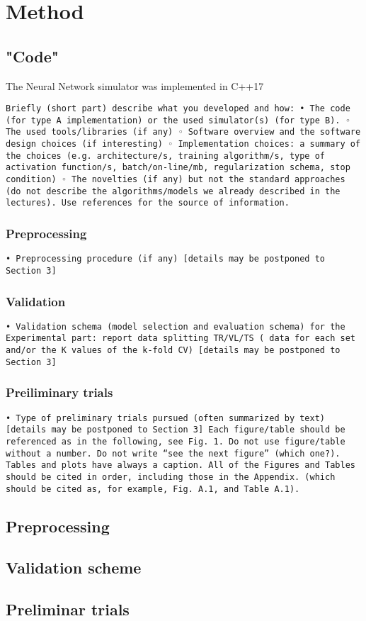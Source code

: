 \section{Method}

\subsection{"Code"}
The Neural Network simulator was implemented in C++17 


\texttt{Briefly (short part) describe what you developed and how: 
• The code (for type A implementation) or the used simulator(s) (for type B). 
◦ The used tools/libraries (if any)
◦ Software overview and the software design choices (if interesting)
◦ Implementation choices: a  summary of the choices (e.g. architecture/s, training algorithm/s, type of activation function/s, batch/on-line/mb, regularization schema, stop condition)
◦ The novelties (if any) but not the standard approaches (do not describe the algorithms/models we already described in the lectures). Use references for the source of information. }

\subsubsection{Preprocessing}
\texttt{• Preprocessing procedure (if any) [details may be postponed to Section 3]}

\subsubsection{Validation}
\texttt{• Validation schema (model selection and evaluation schema) for the Experimental part: report data splitting  TR/VL/TS ( data for each set and/or the K values of the k-fold CV) [details may be postponed to Section 3]}

\subsubsection{Preiliminary trials}
\texttt{• Type of preliminary trials pursued (often summarized by text) [details may be postponed to Section 3]
Each figure/table should be referenced as in the following, see Fig. 1. 
Do not use figure/table without a number. Do not write “see the next figure” (which one?).
Tables and plots have always a caption. All of the Figures and Tables should be cited in order, including those in the Appendix. (which should be cited as, for example, Fig. A.1, and Table A.1).}

\subsection{Preprocessing}
\subsection{Validation scheme}
\subsection{Preliminar trials}